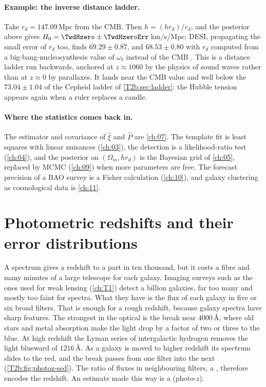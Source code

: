\paragraph{Example: the inverse distance ladder.} Take $r_d=147.09$\,Mpc from the CMB. Then $h=(h r_d)/r_d$, and the posterior above gives $H_0=\TwdHzero\pm\TwdHzeroErr$\,km/s/Mpc; DESI, propagating the small error of $r_d$ too, finds $69.29\pm0.87$, and $68.53\pm0.80$ with $r_d$ computed from a big-bang-nucleosynthesis value of $\omega_b$ instead of the CMB \cite[eqs.~(4.3)--(4.4)]{DESI2024VI}. This is a distance ladder run backwards, anchored at $z\approx1060$ by the physics of sound waves rather than at $z\approx0$ by parallaxes. It lands near the CMB value and well below the $73.04\pm1.04$ of the Cepheid ladder of \cref{T2b:sec:ladder}: the Hubble tension appears again when a ruler replaces a candle.

\paragraph{Where the statistics comes back in.} The estimator and covariance of $\hat\xi$ and $\hat P$ are \cref{ch:07}. The template fit is least squares with linear nuisances (\cref{ch:03}), the detection is a likelihood-ratio test (\cref{ch:04}), and the posterior on $(\Omega_m,hr_d)$ is the Bayesian grid of \cref{ch:05}, replaced by MCMC (\cref{ch:09}) when more parameters are free. The forecast precision of a BAO survey is a Fisher calculation (\cref{ch:10}), and galaxy clustering as cosmological data is \cref{ch:11}.
\section{Photometric redshifts and their error distributions}
\label{T2b:sec:photoz}

A spectrum gives a redshift to a part in ten thousand, but it costs a fibre and many minutes of a large telescope for each galaxy. Imaging surveys such as the ones used for weak lensing (\cref{ch:T1}) detect a billion galaxies, far too many and mostly too faint for spectra. What they have is the flux of each galaxy in five or six broad filters. That is enough for a rough redshift, because galaxy spectra have sharp features. The strongest in the optical is the break near $4000$\,\AA, where old stars and metal absorption make the light drop by a factor of two or three to the blue. At high redshift the Lyman series of intergalactic hydrogen removes the light blueward of $1216$\,\AA. As a galaxy is moved to higher redshift its spectrum slides to the red, and the break passes from one filter into the next (\cref{T2b:fig:photoz-sed}). The ratio of fluxes in neighbouring filters, a , therefore encodes the redshift. An estimate made this way is a  (photo-$z$).

